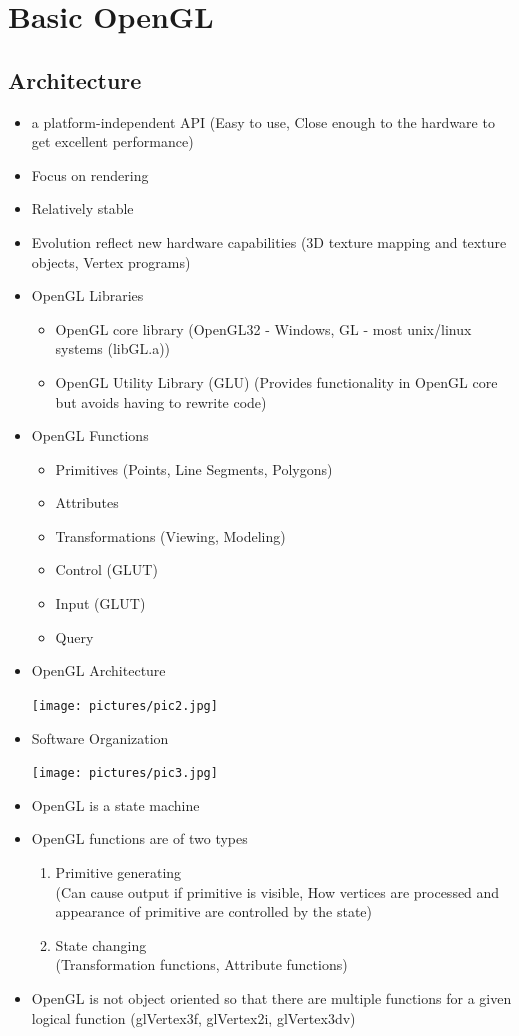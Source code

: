 \documentclass[11pt,a4paper]{article}
\begin{document}
\section{Basic OpenGL}
	\subsection{Architecture}
		\begin{itemize}
			\item  a platform-independent API (Easy to use,  Close enough to the hardware to get excellent performance)
			\item  Focus on rendering
			\item Relatively stable
			\item Evolution reflect new hardware capabilities (3D texture mapping and texture objects, Vertex programs)
			\item OpenGL Libraries
				\begin{itemize}
					\item OpenGL core library (OpenGL32 - Windows,  GL - most unix/linux systems (libGL.a))
					\item OpenGL Utility Library (GLU) (Provides functionality in OpenGL core but avoids having to rewrite code)
				\end{itemize}
			\item OpenGL Functions
				\begin{itemize}
					\item Primitives (Points, Line Segments, Polygons)
					\item Attributes
					\item Transformations (Viewing, Modeling)
					\item Control (GLUT)
					\item  Input (GLUT)
					\item Query
				\end{itemize}
			\item OpenGL Architecture
			\begin{center}
				\texttt{[image: pictures/pic2.jpg]}
			\end{center}
			\item Software Organization
			\begin{center}
				\texttt{[image: pictures/pic3.jpg]}
			\end{center}
			\item OpenGL is a state machine
			\item OpenGL functions are of two types
				\begin{enumerate}
					\item Primitive generating \\
						(Can cause output if primitive is visible, How vertices are processed and appearance of primitive are controlled by the state)
					\item State changing\\
						(Transformation functions, Attribute functions)
				\end{enumerate}
			\item OpenGL is not object oriented so that there are multiple functions for a given logical function (glVertex3f, glVertex2i, glVertex3dv)
		\end{itemize}
\end{document}
